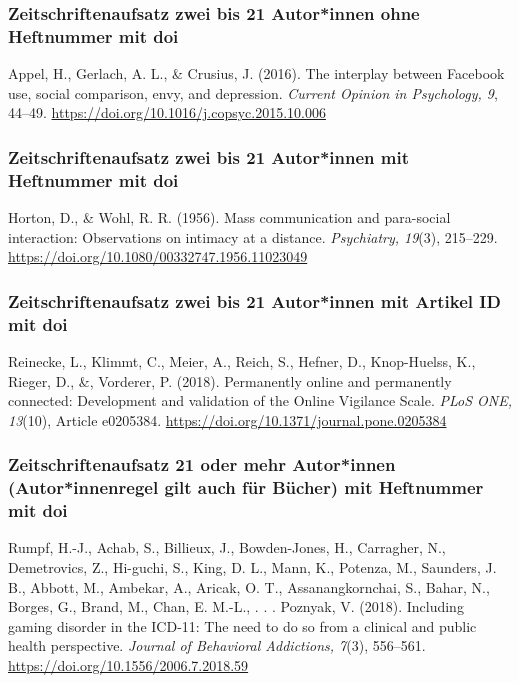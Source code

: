 \documentclass[
  letterpaper,
  DIV=11]{scrreprt}
\begin{document}
\subsubsection{Zeitschriftenaufsatz \textbar{} zwei bis 21 Autor*innen
\textbar{} ohne Heftnummer \textbar{} mit
doi}\label{zeitschriftenaufsatz-zwei-bis-21-autorinnen-ohne-heftnummer-mit-doi}

Appel, H., Gerlach, A. L., \& Crusius, J. (2016). The interplay between
Facebook use, social comparison, envy, and depression. \emph{Current
Opinion in Psychology, 9}, 44--49.
\url{https://doi.org/10.1016/j.copsyc.2015.10.006}

\subsubsection{Zeitschriftenaufsatz \textbar{} zwei bis 21 Autor*innen
\textbar{} mit Heftnummer \textbar{} mit
doi}\label{zeitschriftenaufsatz-zwei-bis-21-autorinnen-mit-heftnummer-mit-doi}

Horton, D., \& Wohl, R. R. (1956). Mass communication and para-social
interaction: Observations on intimacy at a distance. \emph{Psychiatry,
19}(3), 215--229. \url{https://doi.org/10.1080/00332747.1956.11023049}

\subsubsection{Zeitschriftenaufsatz \textbar{} zwei bis 21 Autor*innen
\textbar{} mit Artikel ID \textbar{} mit
doi}\label{zeitschriftenaufsatz-zwei-bis-21-autorinnen-mit-artikel-id-mit-doi}

Reinecke, L., Klimmt, C., Meier, A., Reich, S., Hefner, D., Knop-Huelss,
K., Rieger, D., \&, Vorderer, P. (2018). Permanently online and
permanently connected: Development and validation of the Online
Vigilance Scale. \emph{PLoS ONE, 13}(10), Article e0205384.
\url{https://doi.org/10.1371/journal.pone.0205384}

\subsubsection{Zeitschriftenaufsatz \textbar{} 21 oder mehr Autor*innen
(Autor*innenregel gilt auch für Bücher) \textbar{} mit Heftnummer
\textbar{} mit
doi}\label{zeitschriftenaufsatz-21-oder-mehr-autorinnen-autorinnenregel-gilt-auch-fuxfcr-buxfccher-mit-heftnummer-mit-doi}

Rumpf, H.-J., Achab, S., Billieux, J., Bowden-Jones, H., Carragher, N.,
Demetrovics, Z., Hi-guchi, S., King, D. L., Mann, K., Potenza, M.,
Saunders, J. B., Abbott, M., Ambekar, A., Aricak, O. T.,
Assanangkornchai, S., Bahar, N., Borges, G., Brand, M., Chan, E. M.-L.,
. . . Poznyak, V. (2018). Including gaming disorder in the ICD-11: The
need to do so from a clinical and public health perspective.
\emph{Journal of Behavioral Addictions, 7}(3), 556--561.
\url{https://doi.org/10.1556/2006.7.2018.59}
\end{document}
